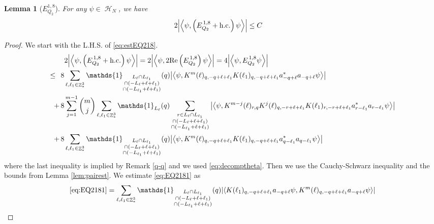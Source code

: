 \documentclass[sn-mathphys, Numbered ,a4paper]{sn-jnl}%
\DeclareMathOperator{\Z}{\mathbb{Z}}
\DeclareMathOperator{\HH}{\mathcal{H}}
\newcommand{\eva}[1]{\left\langle #1 \right\rangle}
\theoremstyle{plain}
\newtheorem{lemma}[theorem]{Lemma}
\theoremstyle{definition}
\theoremstyle{remark}
\theoremstyle{plain}
\theoremstyle{definition}
\theoremstyle{remark}
\begin{document}
\begin{lemma}[$E_{Q_2}^{1,8}$]
	For any $\psi \in \HH_N$, we have
	\begin{align}
		2\abs{\eva{\psi,\left(E^{\,1,8}_{Q_2}+\mathrm{h.c.}\right) \psi }}
		&\leq  C\,  \label{eq:estEQ218}
	\end{align}
\end{lemma}
\begin{proof}
 We start with the L.H.S. of \eqref{eq:estEQ218}.
\begin{align}
	&2\abs{\eva{\psi,\left(E^{\,1,8}_{Q_2}+\mathrm{h.c.}\right) \psi }} = 2\abs{\eva{\psi,2\mathrm{Re}\left(E^{\,1,8}_{Q_2}\right) \psi }} = 4\abs{\eva{\psi, E^{\,1,8}_{Q_2} \psi }}\nonumber\\
	\leq\,\;8& \sum\limits_{\ell, \ell_1\in \Z^3_*} \mathds{1}_{\substack{L_{\ell}\cap L_{\ell_1}\\\cap (-L_{\ell}+\ell+\ell_1) \\ \cap (-L_{\ell_1}+\ell+\ell_1)}}(q) \abs{\eva{\psi, K^m(\ell)_{q,-q+\ell+\ell_1} K(\ell_1)_{q,-q+\ell+\ell_1} a^*_{-q+\ell}a_{-q+\ell} \psi }} \label{eq:EQ2181}\\
	+\,8& \sum\limits_{j=1}^{m-1} {{m}\choose j} \sum\limits_{\ell, \ell_1\in \Z^3_*}\mathds{1}_{L_{\ell}}(q) \sum\limits_{\substack{r\in L_{\ell} \cap L_{\ell_1}\\\cap (-L_{\ell}+\ell+\ell_1) \\ \cap (-L_{\ell_1}+\ell+\ell_1)}}  \abs{\eva{\psi, K^{m-j}(\ell)_{r,q} K^j(\ell)_{q,-r+\ell+\ell_1} K(\ell_1)_{r,-r+\ell+\ell_1} a^*_{r-\ell_1}a_{r-\ell_1} \psi }} \label{eq:EQ2182}\\
	+\,8&\sum\limits_{\ell, \ell_1\in \Z^3_*} \mathds{1}_{\substack{L_{\ell}\cap L_{\ell_1}\\\cap (-L_{\ell}+\ell+\ell_1) \\ \cap (-L_{\ell_1}+\ell+\ell_1)}} (q) \abs{\eva{\psi, K^m(\ell)_{q,-q+\ell+\ell_1}K(\ell_1)_{q,-q+\ell+\ell_1} a^*_{q-\ell_1}a_{q-\ell_1}\psi }} \label{eq:EQ2183}
\end{align}
where the last inequality is implied by Remark \ref{q-q} and we used \eqref{eq:decomptheta}. Then we use the Cauchy-Schwarz inequality and the bounds from Lemma \ref{lem:pairest}.
We estimate \eqref{eq:EQ2181} as 
\begin{align}
	 \eqref{eq:EQ2181}
	&= \sum\limits_{\ell, \ell_1\in \Z^3_*} \mathds{1}_{\substack{L_{\ell}\cap L_{\ell_1}\\\cap (-L_{\ell}+\ell+\ell_1) \\ \cap (-L_{\ell_1}+\ell+\ell_1)}}(q) \abs{\eva{ K(\ell_1)_{q,-q+\ell+\ell_1} a_{-q+\ell} \psi, K^m(\ell)_{q,-q+\ell+\ell_1} a_{-q+\ell} \psi }}\nonumber\\

\end{align}
\end{proof}
\end{document}
